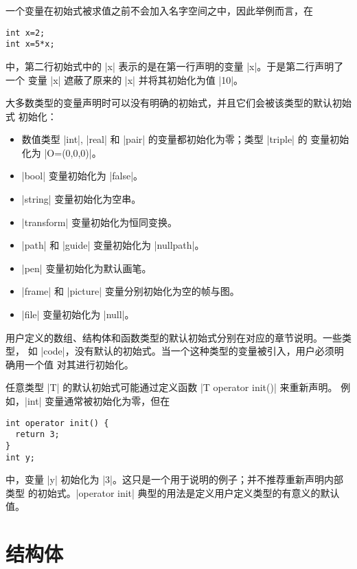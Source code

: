 \documentclass[nofonts,CJKnormalspaces]{ctexbook}[2009/05/20]
\begin{document}
一个变量在初始式被求值之前不会加入名字空间之中，因此举例而言，在
\begin{lstlisting}
int x=2;
int x=5*x;
\end{lstlisting}
中，第二行初始式中的 |x| 表示的是在第一行声明的变量 |x|。于是第二行声明了一个
变量 |x| 遮蔽了原来的 |x| 并将其初始化为值 |10|。

大多数类型的变量声明时可以没有明确的初始式，并且它们会被该类型的默认初始式
初始化：
\begin{itemize}
  \item 数值类型 |int|, |real| 和 |pair| 的变量都初始化为零；类型 |triple| 的
    变量初始化为 |O=(0,0,0)|。
  \item |bool| 变量初始化为 |false|。
  \item |string| 变量初始化为空串。
  \item |transform| 变量初始化为恒同变换。
  \item |path| 和 |guide| 变量初始化为 |nullpath|。
  \item |pen| 变量初始化为默认画笔。
  \item |frame| 和 |picture| 变量分别初始化为空的帧与图。
  \item |file| 变量初始化为 |null|。
\end{itemize}

用户定义的数组、结构体和函数类型的默认初始式分别在对应的章节说明。一些类型，
如 |code|，没有默认的初始式。当一个这种类型的变量被引入，用户必须明确用一个值
对其进行初始化。

任意类型 |T| 的默认初始式可能通过定义函数 |T operator init()| 来重新声明。
例如，|int| 变量通常被初始化为零，但在
\begin{lstlisting}
int operator init() {
  return 3;
}
int y;
\end{lstlisting}
中，变量 |y| 初始化为 |3|。这只是一个用于说明的例子；并不推荐重新声明内部类型
的初始式。|operator init| 典型的用法是定义用户定义类型的有意义的默认值。



\section{结构体}
\label{sec:structures}
\end{document}
